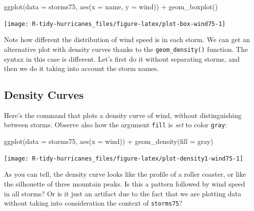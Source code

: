 \documentclass[
]{book}
\newenvironment{Shaded}{\begin{snugshade}}{\end{snugshade}}
\newcommand{\AttributeTok}[1]{\textcolor[rgb]{0.77,0.63,0.00}{#1}}
\newcommand{\FunctionTok}[1]{\textcolor[rgb]{0.00,0.00,0.00}{#1}}
\newcommand{\NormalTok}[1]{#1}
\newcommand{\SpecialCharTok}[1]{\textcolor[rgb]{0.00,0.00,0.00}{#1}}
\newcommand{\StringTok}[1]{\textcolor[rgb]{0.31,0.60,0.02}{#1}}
\begin{document}
\begin{Shaded}
\begin{Highlighting}[]
\FunctionTok{ggplot}\NormalTok{(}\AttributeTok{data =}\NormalTok{ storms75, }\FunctionTok{aes}\NormalTok{(}\AttributeTok{x =}\NormalTok{ name, }\AttributeTok{y =}\NormalTok{ wind)) }\SpecialCharTok{+}
  \FunctionTok{geom\_boxplot}\NormalTok{()}
\end{Highlighting}
\end{Shaded}

\begin{center}\texttt{[image: R-tidy-hurricanes\_files/figure-latex/plot-box-wind75-1]} \end{center}

Note how different the distribution of wind speed is in each storm. We can get
an alternative plot with density curves thanks to the \texttt{geom\_density()} function.
The syntax in this case is different. Let's first do it without separating
storms, and then we do it taking into account the storm names.

\hypertarget{density-curves}{%
\subsection{Density Curves}\label{density-curves}}

Here's the command that plots a density curve of wind, without distinguishing
between storms. Observe also how the argument \texttt{fill} is \emph{set} to color \texttt{\textquotesingle{}gray\textquotesingle{}}:

\begin{Shaded}
\begin{Highlighting}[]
\FunctionTok{ggplot}\NormalTok{(}\AttributeTok{data =}\NormalTok{ storms75, }\FunctionTok{aes}\NormalTok{(}\AttributeTok{x =}\NormalTok{ wind)) }\SpecialCharTok{+}
  \FunctionTok{geom\_density}\NormalTok{(}\AttributeTok{fill =} \StringTok{\textquotesingle{}gray\textquotesingle{}}\NormalTok{)}
\end{Highlighting}
\end{Shaded}

\begin{center}\texttt{[image: R-tidy-hurricanes\_files/figure-latex/plot-density1-wind75-1]} \end{center}

As you can tell, the density curve looks like the profile of a roller coaster,
or like the silhouette of three mountain peaks. Is this a pattern followed
by wind speed in all storms? Or is it just an artifact due to the fact that we
are plotting data without taking into consideration the context of \texttt{storms75}?
\end{document}
